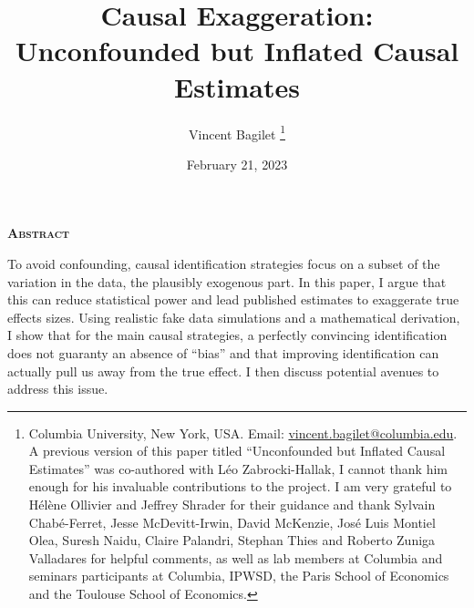 \documentclass[usletter, 12pt]{article}
\begin{document}

	
	\title{Causal Exaggeration:\\ Unconfounded but Inflated Causal Estimates}

	\author{Vincent Bagilet
		\thanks{Columbia University, New York, USA. Email: \url{vincent.bagilet@columbia.edu}. 
			A previous version of this paper titled ``Unconfounded but Inflated Causal Estimates'' was co-authored with Léo Zabrocki-Hallak, I cannot thank him enough for his invaluable contributions to the project. I am very grateful to Hélène Ollivier and Jeffrey Shrader for their guidance and thank Sylvain Chabé-Ferret, Jesse McDevitt-Irwin, David McKenzie, José Luis Montiel Olea, Suresh Naidu, Claire Palandri, Stephan Thies and Roberto Zuniga Valladares for helpful comments, as well as lab members at Columbia and seminars participants at Columbia, IPWSD, the Paris School of Economics and the Toulouse School of Economics.}
	}
	

	\date{February 21, 2023}
	
	
	\maketitle
	
	\begin{center}
		\large \textsc{\textbf{Abstract}}\\
	\end{center}
		
		
		To avoid confounding, causal identification strategies focus on a subset of the variation in the data, the plausibly exogenous part. In this paper, I argue that this can reduce statistical power and lead published estimates to exaggerate true effects sizes. Using realistic fake data simulations and a mathematical derivation, I show that for the main causal strategies, a perfectly convincing identification does not guaranty an absence of ``bias'' and that improving identification can actually pull us away from the true effect. I then discuss potential avenues to address this issue.
		
\end{document}
